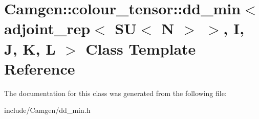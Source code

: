 \hypertarget{a00122}{\section{Camgen\-:\-:colour\-\_\-tensor\-:\-:dd\-\_\-min$<$ adjoint\-\_\-rep$<$ S\-U$<$ N $>$ $>$, I, J, K, L $>$ Class Template Reference}
\label{a00122}
}


The documentation for this class was generated from the following file\-:\begin{DoxyCompactItemize}
\item 
include/\-Camgen/dd\-\_\-min.\-h\end{DoxyCompactItemize}
